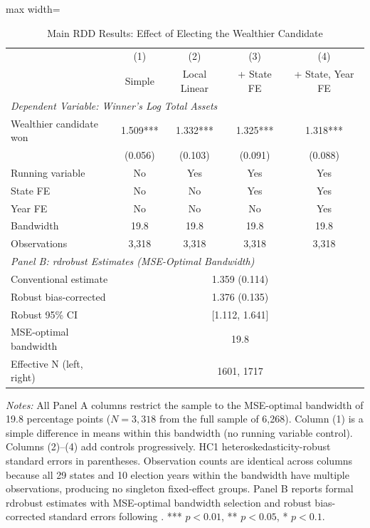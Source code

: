 \begin{table}[htbp]
\centering
\caption{Main RDD Results: Effect of Electing the Wealthier Candidate}
\label{tab:main}
\begin{adjustbox}{max width=\textwidth}
\begin{tabular}{lcccc}
\hline\hline
 & (1) & (2) & (3) & (4) \\
 & Simple & Local Linear & + State FE & + State, Year FE \\
\hline
\multicolumn{5}{l}{\textit{Dependent Variable: Winner's Log Total Assets}} \\
[0.5em]
Wealthier candidate won & 1.509*** & 1.332*** & 1.325*** & 1.318*** \\
 & (0.056) & (0.103) & (0.091) & (0.088) \\
[0.5em]
Running variable & No & Yes & Yes & Yes \\
State FE & No & No & Yes & Yes \\
Year FE & No & No & No & Yes \\
Bandwidth & 19.8 & 19.8 & 19.8 & 19.8 \\
Observations & 3,318 & 3,318 & 3,318 & 3,318 \\
\hline
[0.5em]
\multicolumn{5}{l}{\textit{Panel B: rdrobust Estimates (MSE-Optimal Bandwidth)}} \\
[0.5em]
Conventional estimate & \multicolumn{4}{c}{1.359 (0.114)} \\
Robust bias-corrected & \multicolumn{4}{c}{1.376 (0.135)} \\
Robust 95\% CI & \multicolumn{4}{c}{[1.112, 1.641]} \\
MSE-optimal bandwidth & \multicolumn{4}{c}{19.8} \\
Effective N (left, right) & \multicolumn{4}{c}{1601, 1717} \\
\hline\hline
\end{tabular}
\end{adjustbox}
\begin{minipage}{0.95\textwidth}
\footnotesize
\textit{Notes:} All Panel A columns restrict the sample to the MSE-optimal bandwidth of 19.8 percentage points ($N = 3{,}318$ from the full sample of 6,268). Column (1) is a simple difference in means within this bandwidth (no running variable control). Columns (2)--(4) add controls progressively. HC1 heteroskedasticity-robust standard errors in parentheses. Observation counts are identical across columns because all 29 states and 10 election years within the bandwidth have multiple observations, producing no singleton fixed-effect groups. Panel B reports formal rdrobust estimates with MSE-optimal bandwidth selection and robust bias-corrected standard errors following \citet{calonico2014robust}. *** $p<0.01$, ** $p<0.05$, * $p<0.1$.
\end{minipage}
\end{table}
